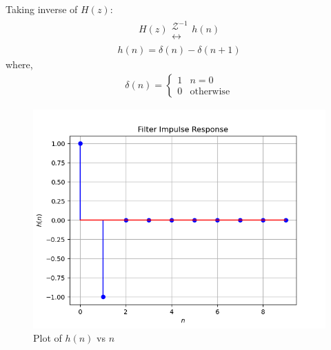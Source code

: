 \documentclass[journal,12pt,twocolumn]{IEEEtran}
\theoremstyle{remark}
\begin{document}
Taking inverse of $H(z)$:
\begin{align}
    H(z) \mathrel{\substack{\mathcal{Z}^{-1}\\\longleftrightarrow}} h(n)
\end{align}
\begin{align}
    h(n) = \delta(n) - \delta(n + 1)
\end{align}
\quad where,
\begin{align}
    \delta(n)
=
\begin{cases}
1 & n = 0
\\
0 & \text{otherwise}
\end{cases}
\end{align}
\begin{figure}[htbp] 
\centering
\includegraphics[width=\columnwidth]{figs/h(n).png}
\caption{Plot of $h(n)$ vs $n$}
\end{figure}

\end{document}

